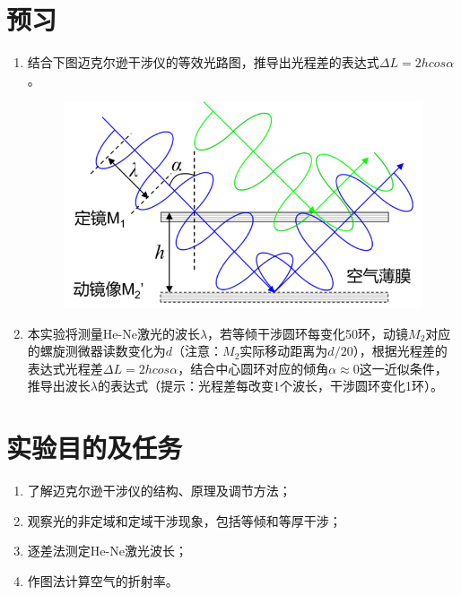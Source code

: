 \documentclass[signature=data]{physicsreport}
\begin{document}
\maketitle

\section{预习}
\begin{enumerate}
    \item 结合下图迈克尔逊干涉仪的等效光路图，推导出光程差的表达式$\Delta L = 2hcos\alpha$。
    \begin{figure}[htbp]
    \flushright
    \includegraphics{images/lab1/figure1.png}
    \end{figure} 
    \vspace{3cm}
    \item 本实验将测量He-Ne激光的波长$\lambda$，若等倾干涉圆环每变化50环，动镜$M_2$对应的螺旋测微器读数变化为$d$（注意：$M_2$实际移动距离为$d/20$），根据光程差的表达式光程差$\Delta L = 2hcos\alpha$，结合中心圆环对应的倾角$\alpha \approx 0$这一近似条件，推导出波长$\lambda$的表达式（提示：光程差每改变1个波长，干涉圆环变化1环）。
    \vspace{5cm}
\end{enumerate}

\makeatletter
{}
\makeatother

\section{实验目的及任务}
\begin{enumerate}
    \item 了解迈克尔逊干涉仪的结构、原理及调节方法；
    \item 观察光的非定域和定域干涉现象，包括等倾和等厚干涉；
    \item 逐差法测定He-Ne激光波长；
    \item 作图法计算空气的折射率。
\end{enumerate}
\vspace{0.7cm}
\end{document}
